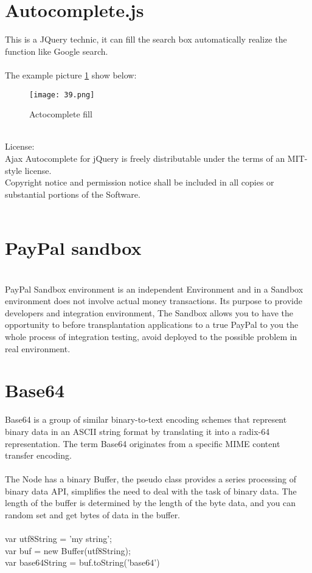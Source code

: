 {\section{Autocomplete.js}\cite{13}
This is a JQuery technic, it can fill the search box automatically realize the function like Google search.\\
\\
The example picture \ref{fig:16 cubed graph} show below: 
\\
\begin{figure}[h]
	\centering
	\texttt{[image: 39.png]}
	\caption{Actocomplete fill}
	\label{fig:16 cubed graph}
\end{figure}
\\
License: \\
Ajax Autocomplete for jQuery is freely distributable under the terms of an MIT-style license.\\
Copyright notice and permission notice shall be included in all copies or substantial portions of the Software.\\
\\
\section{PayPal sandbox}
\\
PayPal Sandbox environment is an independent Environment and in a Sandbox environment does not involve actual money transactions. Its purpose to provide developers and integration environment, The Sandbox allows you to have the opportunity to before transplantation applications to a true PayPal to you the whole process of integration testing, avoid deployed to the possible problem in real environment.
\\
\section{Base64}
Base64 is a group of similar binary-to-text encoding schemes that represent binary data in an ASCII string format by translating it into a radix-64 representation. The term Base64 originates from a specific MIME content transfer encoding.\\
\\
The Node has a binary Buffer, the pseudo class provides a series processing of binary data API, simplifies the need to deal with the task of binary data. The length of the buffer is determined by the length of the byte data, and you can random set and get bytes of data in the buffer.\\
\\
var utf8String = 'my string';\\
var buf = new Buffer(utf8String);\\
var base64String = buf.toString('base64')\\
\\
}
